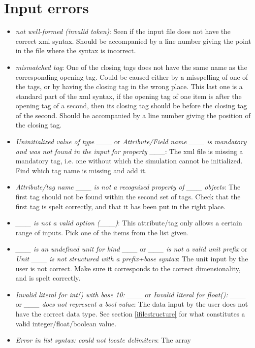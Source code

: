 \documentclass[11pt,english,fleqn]{report}
\begin{document}
\label{trouble}


\section{Input errors}
\begin{itemize}
\item \emph{not well-formed (invalid token)}: Seen if the input file does
not have the correct xml syntax. Should be accompanied by a line number
giving the point in the file where the syntax is incorrect.
\item \emph{mismatched tag}: One of the closing tags does not have the
same name as the corresponding opening tag. Could be caused either
by a misspelling of one of the tags, or by having the closing tag
in the wrong place. This last one is a standard part of the xml syntax,
if the opening tag of one item is after the opening tag of a second,
then its closing tag should be before the closing tag of the second.
Should be accompanied by a line number giving the position of the
closing tag.
\item \emph{Uninitialized value of type \_\_\_} or \emph{Attribute/Field name \_\_\_ is mandatory and was not found in the input for property \_\_\_}:
The xml file is missing a mandatory tag, i.e. one without which the
simulation cannot be initialized. Find which tag name is missing and
add it.
\item \emph{Attribute/tag name \_\_\_ is not a recognized property of \_\_\_ objects}:
The first tag should not be found within the second set of tags. Check
that the first tag is spelt correctly, and that it has been put in
the right place.
\item \emph{\_\_\_ is not a valid option (\_\_\_)}: This attribute/tag
only allows a certain range of inputs. Pick one of the items from
the list given.
\item \emph{\_\_\_ is an undefined unit for kind \_\_\_} or \emph{\_\_\_ is not a valid unit prefix} or \emph{Unit \_\_\_ is not structured with a prefix+base syntax}:
The unit input by the user is not correct. Make sure it corresponds
to the correct dimensionality, and is spelt correctly.
\item \emph{Invalid literal for int() with base 10: \_\_\_} or \emph{Invalid literal for float(): \_\_\_} or \emph{\_\_\_ does not represent a bool value}:
The data input by the user does not have the correct data type. See
section \ref{ifilestructure} for what constitutes a valid integer/float/boolean
value.
\item \emph{Error in list syntax: could not locate delimiters}: The array

\end{itemize}
\end{document}
